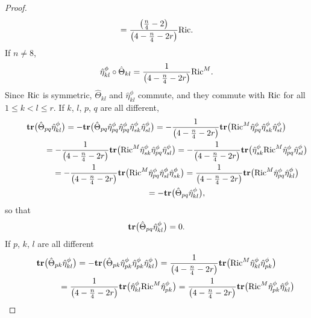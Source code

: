 \documentclass[10pt,a4paper]{amsart}
\newcommand{\tr}{\mbox{\bf tr}}
\numberwithin{equation}{section}
\begin{document}
\begin{proof}
\begin{gather*}
={\left({n\over 4}-2\right)\over \left(4-{n\over 4}-2r\right)} {\rm Ric}.
\end{gather*}
If $n\not = 8$,
\begin{gather}
\hat\eta_{kl}^\phi\circ\hat\Theta_{kl} = {1\over \left(4-{n\over 4}-2r\right)} {\rm Ric}^M. \label{eq: eta theta Ric}
\end{gather}
Since ${\rm Ric}$ is symmetric, $\hat\Theta_{kl}$ and $\hat\eta_{kl}^\phi$ commute, and they commute with ${\rm Ric}$ for all $1\leq k<l\leq r$. If $k$, $l$, $p$, $q$ are all different,
\begin{gather*}
\tr\big(\hat\Theta_{pq}\hat\eta_{kl}^\phi\big) =
-\tr\big(\hat\Theta_{pq}\hat\eta_{pq}^\phi\hat\eta_{pq}^\phi\hat\eta_{sk}^\phi\hat\eta_{sl}^\phi\big) =
-{1\over \left(4-{n\over 4}-2r\right)}\tr\big({\rm Ric}^M\hat\eta_{pq}^\phi\hat\eta_{sk}^\phi\hat\eta_{sl}^\phi\big) \\
\hphantom{\tr\big(\hat\Theta_{pq}\hat\eta_{kl}^\phi\big)}{} =
-{1\over \left(4-{n\over 4}-2r\right)}\tr\big({\rm Ric}^M\hat\eta_{sk}^\phi\hat\eta_{pq}^\phi\hat\eta_{sl}^\phi\big) =
-{1\over \left(4-{n\over 4}-2r\right)}\tr\big(\hat\eta_{sk}^\phi{\rm Ric}^M\hat\eta_{pq}^\phi\hat\eta_{sl}^\phi\big) \\
\hphantom{\tr\big(\hat\Theta_{pq}\hat\eta_{kl}^\phi\big)}{} =
-{1\over \left(4-{n\over 4}-2r\right)}\tr\big({\rm Ric}^M\hat\eta_{pq}^\phi\hat\eta_{sl}^\phi\hat\eta_{sk}^\phi\big) =
{1\over \left(4-{n\over 4}-2r\right)}\tr\big({\rm Ric}^M\hat\eta_{pq}^\phi\hat\eta_{kl}^\phi\big) \\
\hphantom{\tr\big(\hat\Theta_{pq}\hat\eta_{kl}^\phi\big)}{}
 = -\tr\big(\hat\Theta_{pq}\hat\eta_{kl}^\phi\big) ,
\end{gather*}
so that
\begin{gather}
\tr\big(\hat\Theta_{pq}\hat\eta_{kl}^\phi\big)=0.\label{eq: vanishing traces 3}
\end{gather}
If $p$, $k$, $l$ are all different
\begin{gather*}
\tr\big(\hat\Theta_{pk}\hat\eta_{kl}^\phi\big) = -\tr\big(\hat\Theta_{pk}\hat\eta_{pk}^\phi\hat\eta_{pk}^\phi\hat\eta_{kl}^\phi\big)
= {1\over \left(4-{n\over 4}-2r\right)}\tr\big({\rm Ric}^M\hat\eta_{kl}^\phi\hat\eta_{pk}^\phi\big) \\
\hphantom{\tr\big(\hat\Theta_{pk}\hat\eta_{kl}^\phi\big)}{}
 = {1\over \left(4-{n\over 4}-2r\right)}\tr\big(\hat\eta_{kl}^\phi{\rm Ric}^M\hat\eta_{pk}^\phi\big) =
 {1\over \left(4-{n\over 4}-2r\right)}\tr\big({\rm Ric}^M\hat\eta_{pk}^\phi\hat\eta_{kl}^\phi\big) \\

\end{gather*}
\end{proof}
\end{document}
